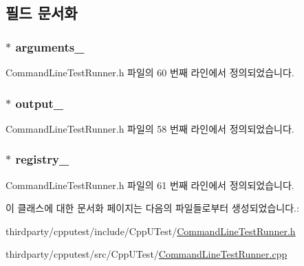 \subsection{필드 문서화}
\subsubsection[{\texorpdfstring{arguments\+\_\+}{arguments_}}]{$\ast$ arguments\+\_\+\hspace{0.3cm}{\ttfamily [private]}}\hypertarget{class_command_line_test_runner_ad70db7454c20154ae8a986a0f28d14d1}{}\label{class_command_line_test_runner_ad70db7454c20154ae8a986a0f28d14d1}


Command\+Line\+Test\+Runner.\+h 파일의 60 번째 라인에서 정의되었습니다.

\subsubsection[{\texorpdfstring{output\+\_\+}{output_}}]{$\ast$ output\+\_\+\hspace{0.3cm}{\ttfamily [protected]}}\hypertarget{class_command_line_test_runner_ae15a8129794917933fb12ba1e4e6de6f}{}\label{class_command_line_test_runner_ae15a8129794917933fb12ba1e4e6de6f}


Command\+Line\+Test\+Runner.\+h 파일의 58 번째 라인에서 정의되었습니다.

\subsubsection[{\texorpdfstring{registry\+\_\+}{registry_}}]{$\ast$ registry\+\_\+\hspace{0.3cm}{\ttfamily [private]}}\hypertarget{class_command_line_test_runner_a06daa3d9c1f367883447738388bd760d}{}\label{class_command_line_test_runner_a06daa3d9c1f367883447738388bd760d}


Command\+Line\+Test\+Runner.\+h 파일의 61 번째 라인에서 정의되었습니다.



이 클래스에 대한 문서화 페이지는 다음의 파일들로부터 생성되었습니다.\+:\begin{DoxyCompactItemize}
\item 
thirdparty/cpputest/include/\+Cpp\+U\+Test/\hyperlink{_command_line_test_runner_8h}{Command\+Line\+Test\+Runner.\+h}\item 
thirdparty/cpputest/src/\+Cpp\+U\+Test/\hyperlink{_command_line_test_runner_8cpp}{Command\+Line\+Test\+Runner.\+cpp}\end{DoxyCompactItemize}
